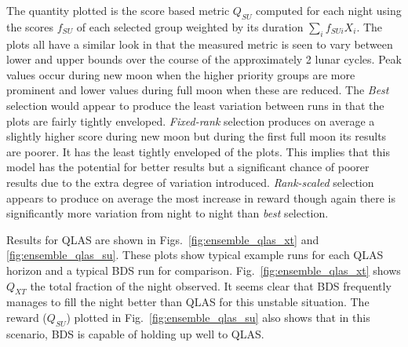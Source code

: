 The quantity plotted is the score based metric $Q_{SU}$ computed for each night using the scores $f_{SU}$ of each selected group weighted by its duration $\sum_i{f_{SUi}X_i}$. The plots all have a similar look in that the measured metric is seen to vary between lower and upper bounds over the course of the approximately 2 lunar cycles. Peak values occur during new moon when the higher priority groups are more prominent and lower values during full moon when these are reduced. The \emph{Best} selection would appear to produce the least variation between runs in that the plots are fairly tightly enveloped. \emph{Fixed-rank} selection produces on average a slightly higher score during new moon but during the first full moon its results are poorer. It has the least tightly enveloped of the plots. This implies that this model has the potential for better results but a significant chance of poorer results due to the extra degree of variation introduced. \emph{Rank-scaled} selection appears to produce on average the most increase in reward though again there is significantly more variation from night to night than \emph{best} selection.

Results for QLAS are shown in Figs.~\ref{fig:ensemble_qlas_xt} and \ref{fig:ensemble_qlas_su}. These plots show typical example runs for each QLAS horizon and a typical BDS run for comparison. Fig.~\ref{fig:ensemble_qlas_xt} shows $Q_{XT}$ the total fraction of the night observed. It seems clear that BDS frequently manages to fill the night better than QLAS for this unstable situation. The reward ($Q_{SU}$) plotted in Fig.~\ref{fig:ensemble_qlas_su} also shows that in this scenario, BDS is capable of holding up well to QLAS.

